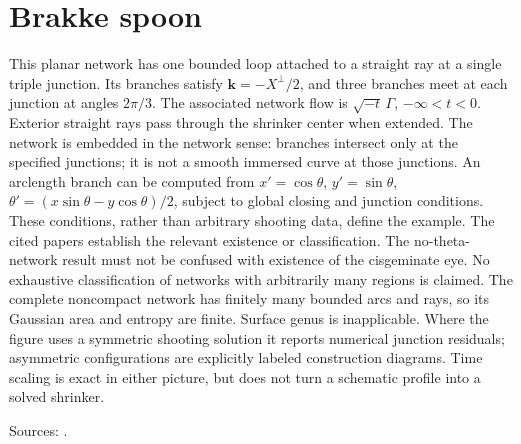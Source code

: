 \chapter{Brakke spoon}\label{sec:catalogue-network-spoon}
\begin{example}\label{ex:catalogue-network-spoon}
This planar network has one bounded loop attached to a straight ray at a single triple junction. Its branches satisfy $\mathbf k=-X^\perp/2$, and three branches meet at each junction at angles $2\pi/3$. The associated network flow is $\sqrt{-t}\,\Gamma$, $-\infty<t<0$. Exterior straight rays pass through the shrinker center when extended. The network is embedded in the network sense: branches intersect only at the specified junctions; it is not a smooth immersed curve at those junctions.
An arclength branch can be computed from $x'=\cos\theta$, $y'=\sin\theta$, $\theta'=(x\sin\theta-y\cos\theta)/2$, subject to global closing and junction conditions. These conditions, rather than arbitrary shooting data, define the example. The cited papers establish the relevant existence or classification. The no-theta-network result must not be confused with existence of the cisgeminate eye. No exhaustive classification of networks with arbitrarily many regions is claimed.
The complete noncompact network has finitely many bounded arcs and rays, so its Gaussian area and entropy are finite. Surface genus is inapplicable. Where the figure uses a symmetric shooting solution it reports numerical junction residuals; asymmetric configurations are explicitly labeled construction diagrams. Time scaling is exact in either picture, but does not turn a schematic profile into a solved shrinker.
\par Sources: \cite{CatChang2026,CatChenGuo2007}.
\end{example}

